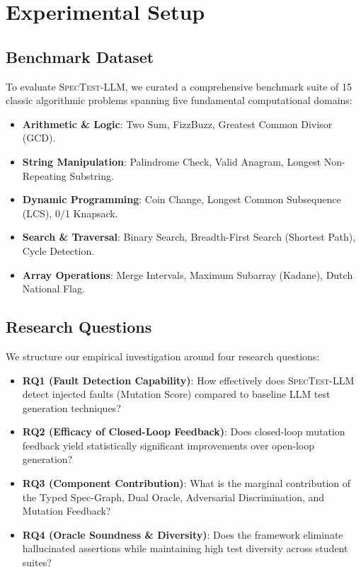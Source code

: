 \documentclass[conference]{IEEEtran}
\begin{document}
\section{Experimental Setup}
\label{sec:experiments}

\subsection{Benchmark Dataset}
To evaluate \textsc{SpecTest-LLM}, we curated a comprehensive benchmark suite of 15 classic algorithmic problems spanning five fundamental computational domains:
\begin{itemize}
    \item \textbf{Arithmetic \& Logic}: Two Sum, FizzBuzz, Greatest Common Divisor (GCD).
    \item \textbf{String Manipulation}: Palindrome Check, Valid Anagram, Longest Non-Repeating Substring.
    \item \textbf{Dynamic Programming}: Coin Change, Longest Common Subsequence (LCS), 0/1 Knapsack.
    \item \textbf{Search \& Traversal}: Binary Search, Breadth-First Search (Shortest Path), Cycle Detection.
    \item \textbf{Array Operations}: Merge Intervals, Maximum Subarray (Kadane), Dutch National Flag.
\end{itemize}

\subsection{Research Questions}
We structure our empirical investigation around four research questions:
\begin{itemize}
    \item \textbf{RQ1 (Fault Detection Capability)}: How effectively does \textsc{SpecTest-LLM} detect injected faults (Mutation Score) compared to baseline LLM test generation techniques?
    \item \textbf{RQ2 (Efficacy of Closed-Loop Feedback)}: Does closed-loop mutation feedback yield statistically significant improvements over open-loop generation?
    \item \textbf{RQ3 (Component Contribution)}: What is the marginal contribution of the Typed Spec-Graph, Dual Oracle, Adversarial Discrimination, and Mutation Feedback?
    \item \textbf{RQ4 (Oracle Soundness \& Diversity)}: Does the framework eliminate hallucinated assertions while maintaining high test diversity across student suites?
\end{itemize}
\end{document}
